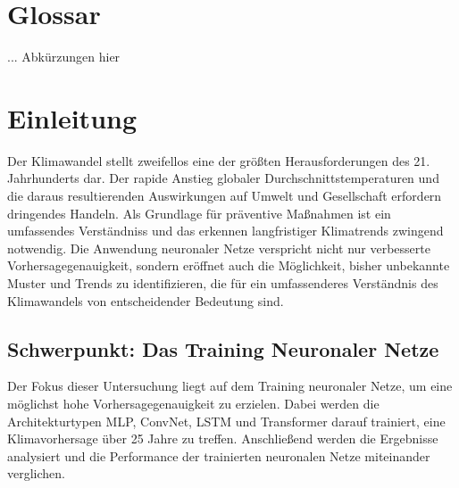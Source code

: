 \documentclass[manuscript,screen,review]{acmart}
\begin{document}



\maketitle

\section{Glossar}
... Abkürzungen hier

\section{Einleitung}
Der Klimawandel stellt zweifellos eine der größten Herausforderungen des 21. Jahrhunderts dar. Der rapide Anstieg globaler Durchschnittstemperaturen und die daraus resultierenden Auswirkungen auf Umwelt und Gesellschaft erfordern dringendes Handeln. Als Grundlage für präventive Maßnahmen ist ein umfassendes Verständniss und das erkennen langfristiger Klimatrends zwingend notwendig. 
Die Anwendung neuronaler Netze verspricht nicht nur verbesserte Vorhersagegenauigkeit, sondern eröffnet auch die Möglichkeit, bisher unbekannte Muster und Trends zu identifizieren, die für ein umfassenderes Verständnis des Klimawandels von entscheidender Bedeutung sind.

\subsection{Schwerpunkt: Das Training Neuronaler Netze}
Der Fokus dieser Untersuchung liegt auf dem Training neuronaler Netze, um eine möglichst hohe Vorhersagegenauigkeit zu erzielen. Dabei werden die Architekturtypen MLP, ConvNet, LSTM und Transformer darauf trainiert, eine Klimavorhersage über 25 Jahre zu treffen. Anschließend werden die Ergebnisse analysiert und die Performance der trainierten neuronalen Netze miteinander verglichen. 
\end{document}
